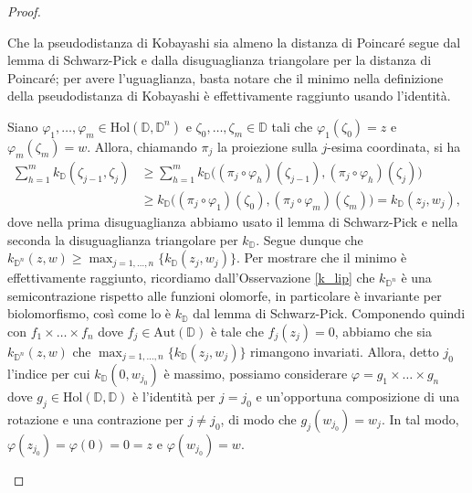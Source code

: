 \begin{proof}
    \begin{nlist}
        \item Che la pseudodistanza di Kobayashi sia almeno la distanza di Poincaré segue dal lemma di Schwarz-Pick e dalla disuguaglianza triangolare per la distanza di Poincaré; per avere l'uguaglianza, basta notare che il minimo nella definizione della pseudodistanza di Kobayashi è effettivamente raggiunto usando l'identità.
        \item Siano $\varphi_1,\dots,\varphi_m \in \text{Hol}(\mathbb{D},\mathbb{D}^n)$ e $\zeta_0,\dots,\zeta_m \in \mathbb{D}$ tali che $\varphi_1(\zeta_0)=z$ e $\varphi_m(\zeta_m)=w$. Allora, chiamando $\pi_j$ la proiezione sulla $j$-esima coordinata, si ha
        \begin{align*}
            \sum_{h=1}^m k_{\mathbb{D}}(\zeta_{j-1},\zeta_j) &\ge \sum_{h=1}^m k_{\mathbb{D}}\big((\pi_j\circ \varphi_h)(\zeta_{j-1}),(\pi_j\circ \varphi_h)(\zeta_j)\big)\\
            & \ge k_{\mathbb{D}}\big((\pi_j\circ \varphi_1)(\zeta_0),(\pi_j\circ \varphi_m)(\zeta_m)\big)=k_{\mathbb{D}}(z_j,w_j),
        \end{align*}
        dove nella prima disuguaglianza abbiamo usato il lemma di Schwarz-Pick e nella seconda la disuguaglianza triangolare per $k_{\mathbb{D}}$. Segue dunque che $k_{\mathbb{D}^n}(z,w)\ge\max_{j=1,\dots,n}\{k_{\mathbb{D}}(z_j,w_j)\}$.
        Per mostrare che il minimo è effettivamente raggiunto, ricordiamo dall'Osservazione \ref{k_lip} che $k_{\mathbb{D}^n}$ è una semicontrazione rispetto alle funzioni olomorfe, in particolare è invariante per biolomorfismo, così come lo è $k_{\mathbb{D}}$ dal lemma di Schwarz-Pick. Componendo quindi con $f_1\times\dots\times f_n$ dove $f_j \in \text{Aut}(\mathbb{D})$ è tale che $f_j(z_j)=0$, abbiamo che sia $k_{\mathbb{D}^n}(z,w)$ che $\max_{j=1,\dots,n}\{k_{\mathbb{D}}(z_j,w_j)\}$ rimangono invariati. Allora, detto $j_0$ l'indice per cui $k_{\mathbb{D}}(0,w_{j_0})$ è massimo, possiamo considerare $\varphi=g_1\times\dots\times g_n$ dove $g_j \in\text{Hol}(\mathbb{D},\mathbb{D})$ è l'identità per $j=j_0$ e un'opportuna composizione di una rotazione e una contrazione per $j\not=j_0$, di modo che $g_j(w_{j_0})=w_j$. In tal modo, $\varphi(z_{j_0})=\varphi(0)=0=z$ e $\varphi(w_{j_0})=w$.
    \end{nlist}
\end{proof}

